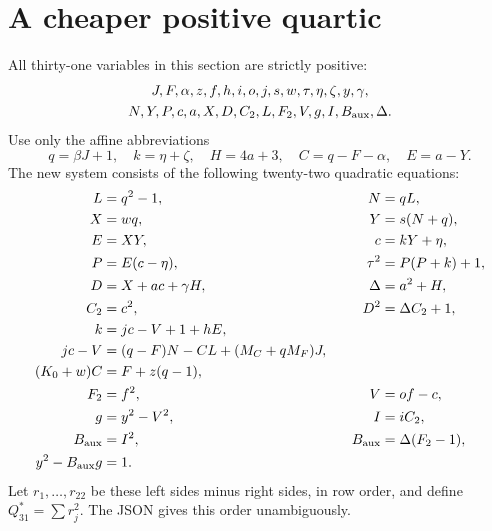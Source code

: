 \documentclass[11pt]{article}
\theoremstyle{remark}\newtheorem{remark}[theorem]{Remark}
\begin{document}
\section{A cheaper positive quartic}\label{sec:quartic}
All thirty-one variables in this section are strictly positive:
\[
\begin{gathered}
 J,F,\alpha,z,f,h,i,o,j,s,w,\tau,\eta,\zeta,y,\gamma,\\
 N,Y,P,c,a,X,D,C_2,L,F_2,V,g,I,B_{\rm aux},\Delta.
\end{gathered}
\]
Use only the affine abbreviations
\[
 q=\beta J+1,\quad k=\eta+\zeta,\quad H=4a+3,\quad
 C=q-F-\alpha,\quad E=a-Y.
\]
The new system consists of the following twenty-two quadratic equations:
\begin{alignat}{2}
 L&=q^2-1,&\qquad N&=qL,\notag\\
 X&=wq,& Y&=s(N+q),\notag\\
 E&=XY,&c&=kY+\eta,\notag\\
 P&=E(c-\eta),&\tau^2&=P(P+k)+1,\notag\\
 D&=X+ac+\gamma H,&\Delta&=a^2+H,\notag\\
 C_2&=c^2,&D^2&=\Delta C_2+1,\notag\\
 k&=jc-V+1+hE,&&\notag\\
 jc-V&=(q-F)N-CL+(M_C+qM_F)J,&&\notag\\
 (K_0+w)C&=F+z(q-1),&&\notag\\
 F_2&=f^2,&V&=of-c,\notag\\
 g&=y^2-V^2,&I&=iC_2,\notag\\
 B_{\rm aux}&=I^2,&B_{\rm aux}&=\Delta(F_2-1),\notag\\
 y^2-B_{\rm aux}g&=1.&&\label{eq:quartic-system}
\end{alignat}
Let $r_1,\ldots,r_{22}$ be these left sides minus right sides, in row order,
and define $Q_{31}^{*}=\sum r_j^2$. The JSON gives this order unambiguously.
\end{document}
